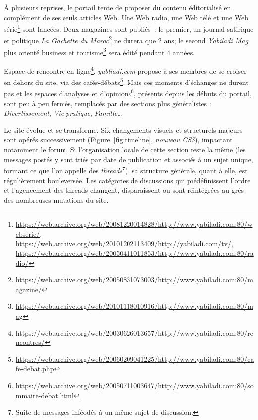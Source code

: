 \documentclass[symmetric,justified,marginals=raggedouter]{tufte-book}
\begin{document}
À plusieurs reprises, le portail tente de proposer du contenu éditorialisé en complément de ses seuls articles Web. Une Web radio, une Web télé et une Web série\footnote{\RaggedOuter \url{https://web.archive.org/web/20081220014828/http://www.yabiladi.com:80/webserie/}, \url{https://web.archive.org/web/20101202113409/http://yabiladi.com/tv/}, \url{https://web.archive.org/web/20050411011853/http://www.yabiladi.com:80/radio/}} sont lancées. Deux magazines sont publiés~: le premier, un journal satirique et politique \textit{La Gachette du Maroc}\footnote{\RaggedOuter \url{https://web.archive.org/web/20050831073003/http://www.yabiladi.com:80/magazine/}} ne durera que 2 ans; le second \textit{Yabiladi Mag} plus orienté business et tourisme\footnote{\RaggedOuter \url{https://web.archive.org/web/20101118010916/http://www.yabiladi.com:80/mag}} sera édité pendant 4 années. 

Espace de rencontre en ligne\footnote{\RaggedOuter \url{https://web.archive.org/web/20030626013657/http://www.yabiladi.com:80/rencontres/}}, \textit{yabliadi.com} propose à ses membres de se croiser en dehors du site, via des cafés-débats\footnote{\RaggedOuter \url{https://web.archive.org/web/20060209041225/http://www.yabiladi.com:80/cafe-debat.php}}. Mais ces moments d'échanges ne durent pas et les espaces d'analyses et d'opinions\footnote{\RaggedOuter \url{https://web.archive.org/web/20050711003647/http://www.yabiladi.com:80/sommaire-debat.html}}, présents depuis les débuts du portail, sont peu à peu fermés, remplacés par des sections plus généralistes : \textit{Divertissement}, \textit{Vie pratique}, \textit{Famille}\ldots{} 

Le site évolue et se transforme. Six changements visuels et structurels majeurs sont opérés successivement (Figure~\ref{fig:timeline}, \textit{nouveau CSS}), impactant notamment le forum. Si l'organisation locale de cette section reste la même (les messages postés y sont triés par date de publication et associés à un sujet unique, formant ce que l'on appelle des \textit{threads}\footnote{\RaggedOuter Suite de messages inféodés à un même sujet de discussion.}), sa structure générale, quant à elle, est régulièrement bouleversée. Les catégories de discussions qui prédéfinissent l'ordre et l'agencement des threads changent, disparaissent ou sont réintégrées au grès des nombreuses mutations du site. 
\end{document}
